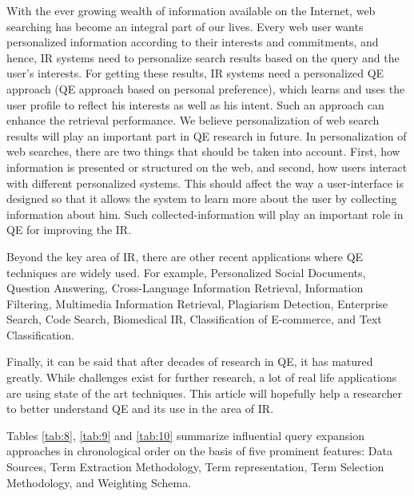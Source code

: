 With the ever growing wealth of information available on the Internet, web searching has become an integral part of our lives. Every web user wants personalized information according to their interests and commitments, and hence, IR systems need to personalize search results based on the query and the user's interests. For getting these results, IR systems need a personalized QE approach (QE approach based on personal preference), which learns and uses the user profile to reflect his interests as well as his intent. Such an approach can enhance the retrieval performance. We believe personalization of web search results will play an important part in QE research in future. In personalization of web searches, there are two things that should be taken into account. First, how information is presented or structured on the web, and second, how users interact with different personalized systems. This should affect the way a user-interface is designed so that it allows the system to learn more about the user by collecting information about him. Such collected-information will  play an important role in QE for improving the IR.

Beyond the key area of IR, there are other recent applications where QE techniques are widely used. For example, Personalized Social Documents, Question Answering, Cross-Language Information Retrieval, Information Filtering, Multimedia Information Retrieval, Plagiarism Detection, Enterprise Search, Code Search, Biomedical IR, Classification of E-commerce, and Text Classification.

Finally, it can be said that after decades of research in QE, it has matured greatly. While challenges exist for further research, a lot of real life applications are using state of the art techniques. This article will hopefully help a researcher to better understand QE and its use in the area of IR. 

Tables \ref{tab:8}, \ref{tab:9} and \ref{tab:10} summarize influential query expansion approaches in chronological order on the basis of five prominent features: Data Sources, Term Extraction Methodology, Term representation, Term Selection Methodology, and Weighting Schema. 

